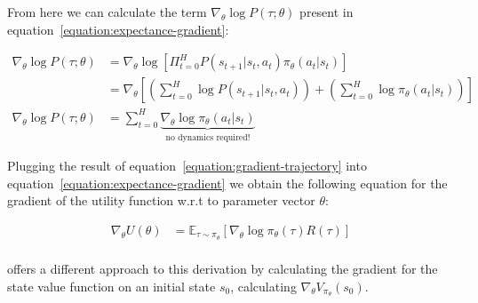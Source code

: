 \documentclass{../main.tex}{}
\begin{document}
From here we can calculate the term $\nabla_{\theta} \log P(\tau ; \theta)$ present in equation~\ref{equation:expectance-gradient}:

\begin{equation}\label{equation:gradient-trajectory}
\begin{aligned}
\nabla_{\theta} \log P(\tau ; \theta) & = \nabla_{\theta} \log [\Pi_{t=0}^{H} P(s_{t+1} | s_t, a_t) \pi_{\theta}(a_t | s_t)] \\
 & = \nabla_{\theta} [(\sum_{t=0}^{H} \log P(s_{t+1} | s_t, a_t)) + (\sum_{t=0}^{H} \log \pi_{\theta}(a_t | s_t))] \\ 
 \nabla_{\theta} \log P(\tau ; \theta)& = \sum_{t=0}^{H} \underbrace{\nabla_{\theta} \log \pi_{\theta}(a_t | s_t)}_\textrm{no dynamics required!}
\end{aligned}
\end{equation}

Plugging the result of equation~\ref{equation:gradient-trajectory} into equation~\ref{equation:expectance-gradient} we obtain the following equation for the gradient of the utility function w.r.t to parameter vector $\theta$:

\begin{equation}
\begin{aligned}
\nabla_{\theta} U(\theta) & = \mathbb{E}_{\tau \sim \pi_{\theta}} [\nabla_{\theta} \log \pi_{\theta}(\tau) R(\tau)] \\
\end{aligned}
\end{equation}

\cite{Sutton1999} offers a different approach to this derivation by calculating the gradient for the state value function on an initial state $s_0$, calculating $\nabla_{\theta} V_{\pi_{\theta}}(s_0)$.
\end{document}
